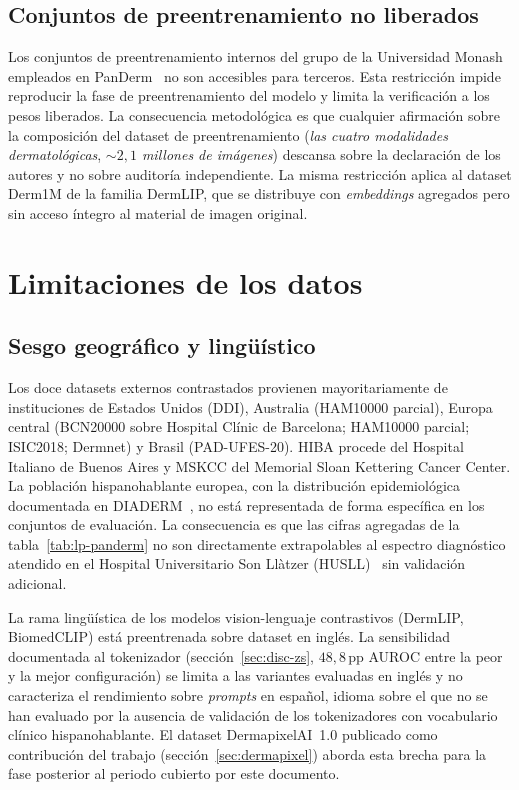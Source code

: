 \subsection{Conjuntos de preentrenamiento no liberados}
\label{sec:lim-preentrenamiento}

Los conjuntos de preentrenamiento internos del grupo de la
Universidad Monash empleados en PanDerm~\cite{panderm2025} no son
accesibles para terceros. Esta restricción impide reproducir la
fase de preentrenamiento del modelo y limita la verificación a los
pesos liberados. La consecuencia metodológica es que cualquier
afirmación sobre la composición del dataset de preentrenamiento
(\emph{las cuatro modalidades dermatológicas}, \emph{$\sim 2{,}1$
millones de imágenes}) descansa sobre la declaración de los autores
y no sobre auditoría independiente. La misma restricción aplica al
dataset Derm1M de la familia DermLIP, que se distribuye con
\emph{embeddings} agregados pero sin acceso íntegro al material de
imagen original.

\section{Limitaciones de los datos}
\label{sec:lim-datos}

\subsection{Sesgo geográfico y lingüístico}
\label{sec:lim-geografico}

Los doce datasets externos contrastados provienen mayoritariamente
de instituciones de Estados Unidos (DDI), Australia
(HAM10000 parcial), Europa central (BCN20000 sobre Hospital Clínic
de Barcelona; HAM10000 parcial; ISIC2018; Dermnet) y Brasil
(PAD-UFES-20). HIBA procede del Hospital Italiano de Buenos Aires
y MSKCC del Memorial Sloan Kettering Cancer Center. La población
hispanohablante europea, con la distribución epidemiológica
documentada en DIADERM~\cite{diaderm2018}, no está representada de
forma específica en los conjuntos de evaluación. La consecuencia
es que las cifras agregadas de la tabla~\ref{tab:lp-panderm} no
son directamente extrapolables al espectro diagnóstico atendido en
el Hospital Universitario Son Llàtzer
(HUSLL)~\cite{taberner2010_motivos} sin validación adicional.

La rama lingüística de los modelos vision-lenguaje contrastivos
(DermLIP, BiomedCLIP) está preentrenada sobre dataset en inglés. La
sensibilidad documentada al tokenizador (sección~\ref{sec:disc-zs},
$48{,}8$\,pp AUROC entre la peor y la mejor configuración) se
limita a las variantes evaluadas en inglés y no caracteriza el
rendimiento sobre \emph{prompts} en español, idioma sobre el que
no se han evaluado por la ausencia de validación de los
tokenizadores con vocabulario clínico hispanohablante. El dataset
DermapixelAI~1.0 publicado como contribución del trabajo
(sección~\ref{sec:dermapixel}) aborda esta brecha para la fase
posterior al periodo cubierto por este documento.


